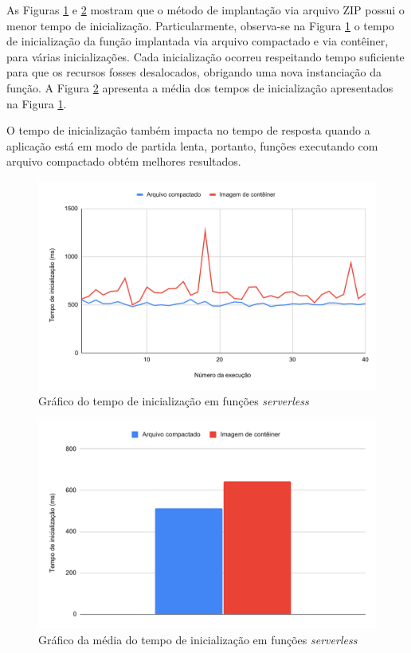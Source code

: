 \documentclass[conference]{IEEEtran}
\begin{document}
As Figuras \ref{graph:functions_init_time} e \ref{graph:functions_init_time_average} mostram que o método de implantação via arquivo ZIP possui o menor tempo de inicialização. Particularmente, observa-se na Figura \ref{graph:functions_init_time} o tempo de inicialização da função implantada via arquivo compactado e via contêiner, para várias inicializações. Cada inicialização ocorreu respeitando tempo suficiente para que os recursos fosses desalocados, obrigando uma nova instanciação da função. A Figura \ref{graph:functions_init_time_average} apresenta a média dos tempos de inicialização apresentados na Figura \ref{graph:functions_init_time}.

O tempo de inicialização também impacta no tempo de resposta quando a aplicação está em modo de partida lenta, portanto, funções executando com arquivo compactado obtém melhores resultados.

\begin{figure}[H]
    \centering 
    \includegraphics [width=\linewidth]{images/init-time-PT.pdf}
    \par
    \caption{Gráfico do tempo de inicialização em funções \textit{serverless}}
    \label{graph:functions_init_time}
\end{figure}

\begin{figure}[H]
    \centering 
    \includegraphics [width=\linewidth]{images/init-time-average-PT.pdf}
    \par
    \caption{Gráfico da média do tempo de inicialização em funções \textit{serverless}}
    \label{graph:functions_init_time_average}
\end{figure}
\end{document}

